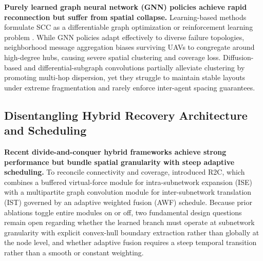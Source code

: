 \documentclass[11pt]{article}
\theoremstyle{plain}
\theoremstyle{definition}
\theoremstyle{remark}
\begin{document}
\textbf{Purely learned graph neural network (GNN) policies achieve rapid reconnection but suffer from spatial collapse.} Learning-based methods formulate SCC as a differentiable graph optimization or reinforcement learning problem \citep{mou2022resilient,peng2025prioritized,wang2025uav}. While GNN policies adapt effectively to diverse failure topologies, neighborhood message aggregation biases surviving UAVs to congregate around high-degree hubs, causing severe spatial clustering and coverage loss. Diffusion-based and differential-subgraph convolutions \citep{lin2024multihop,lin2025multihop} partially alleviate clustering by promoting multi-hop dispersion, yet they struggle to maintain stable layouts under extreme fragmentation and rarely enforce inter-agent spacing guarantees.

\subsection{Disentangling Hybrid Recovery Architecture and Scheduling}
\textbf{Recent divide-and-conquer hybrid frameworks achieve strong performance but bundle spatial granularity with steep adaptive scheduling.} To reconcile connectivity and coverage, \citet{peng2026r2c} introduced R2C, which combines a buffered virtual-force module for intra-subnetwork expansion (ISE) with a multipartite graph convolution module for inter-subnetwork translation (IST) governed by an adaptive weighted fusion (AWF) schedule. Because prior ablations toggle entire modules on or off, two fundamental design questions remain open regarding whether the learned branch must operate at subnetwork granularity with explicit convex-hull boundary extraction rather than globally at the node level, and whether adaptive fusion requires a steep temporal transition rather than a smooth or constant weighting.
\end{document}
